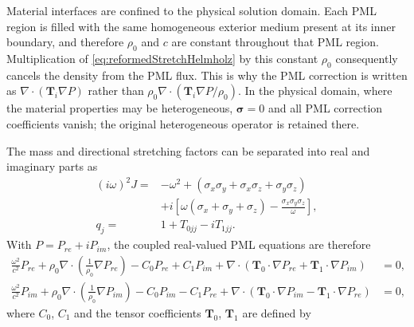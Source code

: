 \documentclass[final,12pt,nopreprintline,longtitle]{elsarticle}
\begin{document}
Material interfaces are confined to the physical solution domain.  Each PML
region is filled with the same homogeneous exterior medium present at its inner
boundary, and therefore $\rho_0$ and $c$ are constant throughout that PML
region.  Multiplication of \cref{eq:reformedStretchHelmholz} by this constant
$\rho_0$ consequently cancels the density from the PML flux.  This is why the
PML correction is written as $\nabla\cdot(\mathbf{T}_i\nabla P)$ rather than
$\rho_0\nabla\cdot(\mathbf{T}_i\nabla P/\rho_0)$.  In the physical domain,
where the material properties may be heterogeneous, $\boldsymbol{\sigma}=0$
and all PML correction coefficients vanish; the original heterogeneous
operator is retained there.

The mass and directional stretching factors can be separated into real and
imaginary parts as
\begin{equation}
\begin{aligned}
    (i\omega)^2J
    ={}&-\omega^2
       +(\sigma_x\sigma_y+\sigma_x\sigma_z+\sigma_y\sigma_z)\\
      &+i\left[
        \omega(\sigma_x+\sigma_y+\sigma_z)
        -\frac{\sigma_x\sigma_y\sigma_z}{\omega}
      \right],\\
    q_j={}&1+T_{0jj}-iT_{1jj}.
\end{aligned}
\label{eq:pmlComplexSplit}
\end{equation}
With $P=P_{re}+iP_{im}$, the coupled real-valued PML equations are therefore
\begin{equation}
\begin{aligned}
    \frac{\omega^2}{c^2}P_{re}
    +\rho_0\nabla\cdot\left(\frac{1}{\rho_0}\nabla P_{re}\right)
    -C_0P_{re}+C_1P_{im}
    +\nabla\cdot\left(\mathbf{T}_0\cdot\nabla P_{re}
                     +\mathbf{T}_1\cdot\nabla P_{im}\right)&=0,\\
    \frac{\omega^2}{c^2}P_{im}
    +\rho_0\nabla\cdot\left(\frac{1}{\rho_0}\nabla P_{im}\right)
    -C_0P_{im}-C_1P_{re}
    +\nabla\cdot\left(\mathbf{T}_0\cdot\nabla P_{im}
                     -\mathbf{T}_1\cdot\nabla P_{re}\right)&=0,
\end{aligned}
\label{eq:helmholtzPML}
\end{equation}
where $C_0$, $C_1$ and the tensor coefficients $\mathbf{T}_0$, $\mathbf{T}_1$
are defined by
\end{document}
